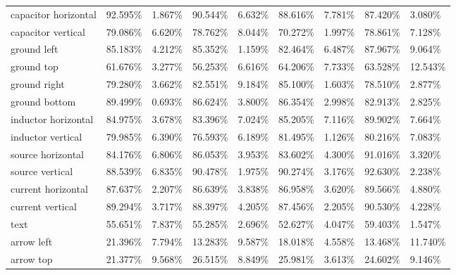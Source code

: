 \begin{table}[H]
\begin{center}
\begin{tabular}{|l|l|l|l|l|l|l|l|l|}
\rowcolor{lightgray!50}
capacitor horizontal            & 92.595\% & 1.867\%  & 90.544\% & 6.632\%  & 88.616\% & 7.781\%  & 87.420\% & 3.080\%   \\
capacitor vertical              & 79.086\% & 6.620\%  & 78.762\% & 8.044\%  & 70.272\% & 1.997\%  & 78.861\% & 7.128\%   \\
\rowcolor{lightgray!50}
ground left                     & 85.183\% & 4.212\%  & 85.352\% & 1.159\%  & 82.464\% & 6.487\%  & 87.967\% & 9.064\%   \\
ground top                      & 61.676\% & 3.277\%  & 56.253\% & 6.616\%  & 64.206\% & 7.733\%  & 63.528\% & 12.543\%  \\
\rowcolor{lightgray!50}
ground right                    & 79.280\% & 3.662\%  & 82.551\% & 9.184\%  & 85.100\% & 1.603\%  & 78.510\% & 2.877\%   \\
ground bottom                   & 89.499\% & 0.693\%  & 86.624\% & 3.800\%  & 86.354\% & 2.998\%  & 82.913\% & 2.825\%   \\
\rowcolor{lightgray!50}
inductor horizontal             & 84.975\% & 3.678\%  & 83.396\% & 7.024\%  & 85.205\% & 7.116\%  & 89.902\% & 7.664\%   \\
inductor vertical               & 79.985\% & 6.390\%  & 76.593\% & 6.189\%  & 81.495\% & 1.126\%  & 80.216\% & 7.083\%   \\
\rowcolor{lightgray!50}
source horizontal               & 84.176\% & 6.806\%  & 86.053\% & 3.953\%  & 83.602\% & 4.300\%  & 91.016\% & 3.320\%   \\
source vertical                 & 88.539\% & 6.835\%  & 90.478\% & 1.975\%  & 90.274\% & 3.176\%  & 92.630\% & 2.238\%   \\
\rowcolor{lightgray!50}
current horizontal              & 87.637\% & 2.207\%  & 86.639\% & 3.838\%  & 86.958\% & 3.620\%  & 89.566\% & 4.880\%   \\
current vertical                & 89.294\% & 3.717\%  & 88.397\% & 4.205\%  & 87.456\% & 2.205\%  & 90.530\% & 4.228\%   \\
\rowcolor{lightgray!50}
text                            & 55.651\% & 7.837\%  & 55.285\% & 2.696\%  & 52.627\% & 4.047\%  & 59.403\% & 1.547\%   \\
arrow left                      & 21.396\% & 7.794\%  & 13.283\% & 9.587\%  & 18.018\% & 4.558\%  & 13.468\% & 11.740\%  \\
\rowcolor{lightgray!50}
arrow top                       & 21.377\% & 9.568\%  & 26.515\% & 8.849\%  & 25.981\% & 3.613\%  & 24.602\% & 9.146\%   \\

\end{tabular}
\end{center}
\end{table}
